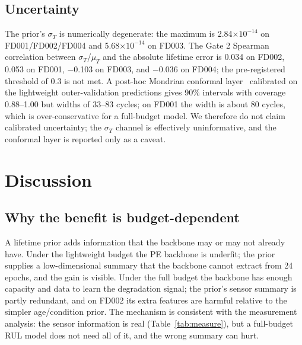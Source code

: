 \documentclass[journal]{IEEEtran}
\begin{document}


\subsection{Uncertainty}
The prior's $\sigma_T$ is numerically degenerate: the maximum is 2.84$\times10^{-14}$ on FD001/FD002/FD004 and 5.68$\times10^{-14}$ on FD003. The Gate 2 Spearman correlation between $\sigma_T$/$\mu_T$ and the absolute lifetime error is 0.034 on FD002, 0.053 on FD001, $-$0.103 on FD003, and $-$0.036 on FD004; the pre-registered threshold of 0.3 is not met. A post-hoc Mondrian conformal layer~\cite{ref14,ref15} calibrated on the lightweight outer-validation predictions gives 90\% intervals with coverage 0.88--1.00 but widths of 33--83 cycles; on FD001 the width is about 80 cycles, which is over-conservative for a full-budget model. We therefore do not claim calibrated uncertainty; the $\sigma_T$ channel is effectively uninformative, and the conformal layer is reported only as a caveat.

\section{Discussion}
\subsection{Why the benefit is budget-dependent}
A lifetime prior adds information that the backbone may or may not already have. Under the lightweight budget the PE backbone is underfit; the prior supplies a low-dimensional summary that the backbone cannot extract from 24 epochs, and the gain is visible. Under the full budget the backbone has enough capacity and data to learn the degradation signal; the prior's sensor summary is partly redundant, and on FD002 its extra features are harmful relative to the simpler age/condition prior. The mechanism is consistent with the measurement analysis: the sensor information is real (Table~\ref{tab:measure}), but a full-budget RUL model does not need all of it, and the wrong summary can hurt.
\end{document}
